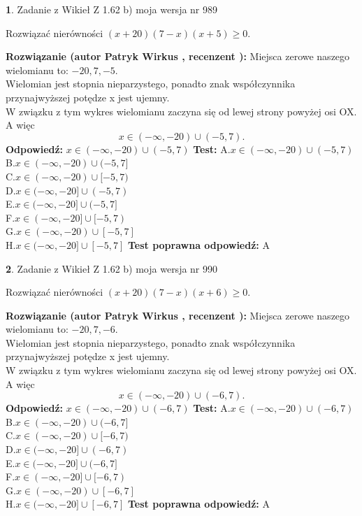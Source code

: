 \documentclass[12pt, a4paper]{article}
\theoremstyle{definition} %
\newtheorem{zad}{}
\newcommand{\zadStart}[1]{\begin{zad}#1\newline}
\newcommand{\zadStop}{\end{zad}}
\newcommand{\rozwStart}[2]{\noindent \textbf{Rozwiązanie (autor #1 , recenzent #2): }\newline}
\newcommand{\rozwStop}{\newline}
\newcommand{\odpStart}{\noindent \textbf{Odpowiedź:}\newline}
\newcommand{\odpStop}{\newline}
\newcommand{\testStart}{\noindent \textbf{Test:}\newline}
\newcommand{\testStop}{\newline}
\newcommand{\kluczStart}{\noindent \textbf{Test poprawna odpowiedź:}\newline}
\newcommand{\kluczStop}{\newline}
\begin{document}
\zadStart{Zadanie z Wikieł Z 1.62 b) moja wersja nr 989}

Rozwiązać nierówności $(x+20)(7-x)(x+5)\ge0$.
\zadStop
\rozwStart{Patryk Wirkus}{}
Miejsca zerowe naszego wielomianu to: $-20, 7, -5$.\\
Wielomian jest stopnia nieparzystego, ponadto znak współczynnika przy\linebreak najwyższej potędze x jest ujemny.\\ W związku z tym wykres wielomianu zaczyna się od lewej strony powyżej osi OX. A więc $$x \in (-\infty,-20) \cup (-5,7).$$
\rozwStop
\odpStart
$x \in (-\infty,-20) \cup (-5,7)$
\odpStop
\testStart
A.$x \in (-\infty,-20) \cup (-5,7)$\\
B.$x \in (-\infty,-20) \cup (-5,7]$\\
C.$x \in (-\infty,-20) \cup [-5,7)$\\
D.$x \in (-\infty,-20] \cup (-5,7)$\\
E.$x \in (-\infty,-20] \cup (-5,7]$\\
F.$x \in (-\infty,-20] \cup [-5,7)$\\
G.$x \in (-\infty,-20) \cup [-5,7]$\\
H.$x \in (-\infty,-20] \cup [-5,7]$
\testStop
\kluczStart
A
\kluczStop



\zadStart{Zadanie z Wikieł Z 1.62 b) moja wersja nr 990}

Rozwiązać nierówności $(x+20)(7-x)(x+6)\ge0$.
\zadStop
\rozwStart{Patryk Wirkus}{}
Miejsca zerowe naszego wielomianu to: $-20, 7, -6$.\\
Wielomian jest stopnia nieparzystego, ponadto znak współczynnika przy\linebreak najwyższej potędze x jest ujemny.\\ W związku z tym wykres wielomianu zaczyna się od lewej strony powyżej osi OX. A więc $$x \in (-\infty,-20) \cup (-6,7).$$
\rozwStop
\odpStart
$x \in (-\infty,-20) \cup (-6,7)$
\odpStop
\testStart
A.$x \in (-\infty,-20) \cup (-6,7)$\\
B.$x \in (-\infty,-20) \cup (-6,7]$\\
C.$x \in (-\infty,-20) \cup [-6,7)$\\
D.$x \in (-\infty,-20] \cup (-6,7)$\\
E.$x \in (-\infty,-20] \cup (-6,7]$\\
F.$x \in (-\infty,-20] \cup [-6,7)$\\
G.$x \in (-\infty,-20) \cup [-6,7]$\\
H.$x \in (-\infty,-20] \cup [-6,7]$
\testStop
\kluczStart
A
\kluczStop
\end{document}
